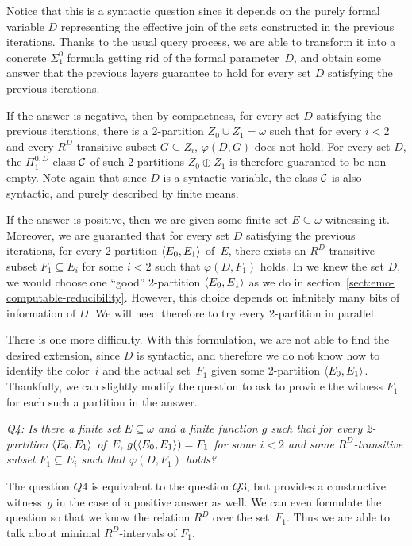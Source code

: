 Notice that this is a syntactic question since it depends on the purely formal variable $D$
representing the effective join of the sets constructed in the previous iterations.
Thanks to the usual query process, we are able to transform it into a concrete $\Sigma^0_1$
formula getting rid of the formal parameter~$D$, 
and obtain some answer that the previous layers guarantee to hold for every set $D$
satisfying the previous iterations.

If the answer is negative, then by compactness, for every set $D$ satisfying the previous iterations,
there is a 2-partition $Z_0 \cup Z_1 = \omega$ such that for every $i < 2$ and every $R^D$-transitive
subset $G \subseteq Z_i$, $\varphi(D, G)$ does not hold. For every set $D$,
the $\Pi^{0,D}_1$ class $\mathcal{C}$ of such 2-partitions $Z_0 \oplus Z_1$ is therefore guaranted to be non-empty.
Note again that since $D$ is a syntactic variable, the class $\mathcal{C}$ is also syntactic,
and purely described by finite means.

If the answer is positive, then we are given some finite set $E \subseteq \omega$ witnessing it.
Moreover, we are guaranted that for every set $D$ satisfying the previous iterations,
for every 2-partition $\left\langle E_0, E_1 \right\rangle$ of~$E$, there exists an $R^D$-transitive subset 
$F_1 \subseteq E_i$ for some $i < 2$ such that $\varphi(D, F_1)$ holds.
In we knew the set $D$, we would choose one ``good'' 2-partition $\left\langle E_0, E_1 \right\rangle$
as we do in section~\ref{sect:emo-computable-reducibility}. However, this choice
depends on infinitely many bits of information of $D$. We will need therefore to
try every 2-partition in parallel.

There is one more difficulty.
With this formulation, we are not able to find the desired extension, since $D$ is syntactic,
and therefore we do not know how to identify the color~$i$ and the actual set~$F_1$ given some 2-partition $\left\langle E_0, E_1 \right\rangle$.
Thankfully, we can slightly modify the question to ask to provide the witness $F_1$ for each such a partition
in the answer.

\smallskip
{\itshape
Q4: Is there a finite set $E \subseteq \omega$ and a finite function $g$ such that for every 2-partition $\left\langle E_0, E_1 \right\rangle$ of~$E$,
$g(\left\langle E_0, E_1 \right\rangle) = F_1$ for some $i < 2$ and some $R^D$-transitive subset $F_1 \subseteq E_i$ such that $\varphi(D, F_1)$ holds?
}
\smallskip

The question $Q4$ is equivalent to the question $Q3$, but provides a constructive witness~$g$
in the case of a positive answer as well. We can even formulate the question so that we know the relation $R^D$
over the set~$F_1$. Thus we are able to talk about minimal $R^D$-intervals of $F_1$.

